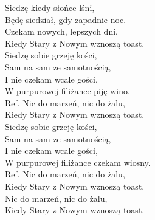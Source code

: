 
Siedzę kiedy słońce lśni, \\
Będę siedział, gdy zapadnie noc. \\
Czekam nowych, lepszych dni, \\
Kiedy Stary z Nowym wznoszą toast. \\
\hops
Siedzę sobie grzeję kości, \\
Sam na sam ze samotnością, \\
I nie czekam wcale gości, \\
W purpurowej filiżance piję wino. \\
\hops
Ref. Nic do marzeń, nic do żalu,\\
 Kiedy Stary z Nowym wznoszą toast. \\
\hops
Siedzę sobie grzeję kości, \\
Sam na sam ze samotnością, \\
I nie czekam wcale gości, \\
W purpurowej filiżance czekam wiosny. \\
\hops
Ref. Nic do marzeń, nic do żalu,\\
 Kiedy Stary z Nowym wznoszą toast. \\
\hops
{} Nic do marzeń, nic do żalu, \\
 Kiedy Stary z Nowym wznoszą toast.